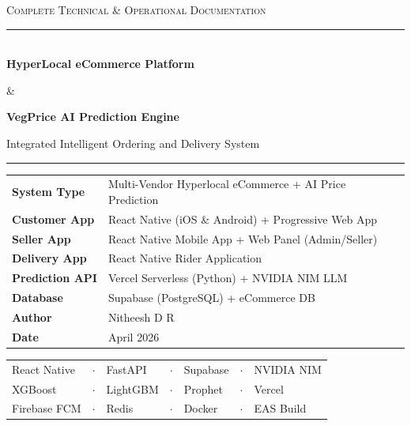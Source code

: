 \documentclass[12pt, a4paper, oneside]{report}
\begin{document}

\begin{titlepage}
\centering
\vspace*{1.6cm}

{\large\scshape Complete Technical \& Operational Documentation}

\vspace{0.6cm}
\rule{\textwidth}{1.4pt}\\[0.5cm]

{\fontsize{30}{38}\selectfont\bfseries HyperLocal eCommerce Platform}

\vspace{0.3cm}
{\Large \&}

\vspace{0.3cm}
{\fontsize{26}{34}\selectfont\bfseries VegPrice AI Prediction Engine}

\vspace{0.4cm}
{\large Integrated Intelligent Ordering and Delivery System}

\vspace{0.4cm}
\rule{\textwidth}{0.6pt}

\vspace{1.8cm}

\begin{tabular}{@{} R{4.4cm} @{\quad} L{8.8cm} @{}}
\textbf{System Type}     & Multi-Vendor Hyperlocal eCommerce + AI Price Prediction \\[6pt]
\textbf{Customer App}    & React Native (iOS \& Android) + Progressive Web App \\[6pt]
\textbf{Seller App}      & React Native Mobile App + Web Panel (Admin/Seller) \\[6pt]
\textbf{Delivery App}    & React Native Rider Application \\[6pt]
\textbf{Prediction API}  & Vercel Serverless (Python) + NVIDIA NIM LLM \\[6pt]
\textbf{Database}        & Supabase (PostgreSQL) + eCommerce DB \\[6pt]
\textbf{Author}          & Nitheesh D R \\[6pt]
\textbf{Date}            & April 2026 \\
\end{tabular}

\vfill

\begin{tabular}{@{} C{2.4cm} C{0.3cm} C{2.4cm} C{0.3cm} C{2.4cm} C{0.3cm} C{2.4cm} @{}}
React Native & $\cdot$ & FastAPI & $\cdot$ & Supabase & $\cdot$ & NVIDIA NIM \\[4pt]
XGBoost      & $\cdot$ & LightGBM & $\cdot$ & Prophet & $\cdot$ & Vercel \\[4pt]
Firebase FCM & $\cdot$ & Redis   & $\cdot$ & Docker  & $\cdot$ & EAS Build \\
\end{tabular}


\end{titlepage}
\end{document}
